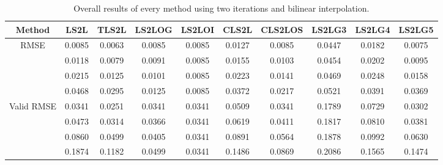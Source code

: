 \begin{table}[ht!]
\centering
\begin{tabular}{c|c|c|c|c|c|c|c|c|c}
Method & \scriptsize{LS2L} & \scriptsize{TLS2L} & \scriptsize{LS2LOG} & \scriptsize{LS2LOI} & \scriptsize{CLS2L} & \scriptsize{CLS2LOS} & \scriptsize{LS2LG3} & \scriptsize{LS2LG4} & \scriptsize{LS2LG5}\\ \hline 
\multirow{4}{*}{RMSE} & 0.0085 & 0.0063 & 0.0085 & 0.0085 & 0.0127 & 0.0085 & 0.0447 & 0.0182 & 0.0075 \\ 
 & 0.0118 & 0.0079 & 0.0091 & 0.0085 & 0.0155 & 0.0103 & 0.0454 & 0.0202 & 0.0095 \\ 
 & 0.0215 & 0.0125 & 0.0101 & 0.0085 & 0.0223 & 0.0141 & 0.0469 & 0.0248 & 0.0158 \\ 
 & 0.0468 & 0.0295 & 0.0125 & 0.0085 & 0.0372 & 0.0217 & 0.0521 & 0.0391 & 0.0369 \\ 
 \hline
\multirow{4}{*}{Valid RMSE} & 0.0341 & 0.0251 & 0.0341 & 0.0341 & 0.0509 & 0.0341 & 0.1789 & 0.0729 & 0.0302 \\ 
 & 0.0473 & 0.0314 & 0.0366 & 0.0341 & 0.0619 & 0.0411 & 0.1817 & 0.0810 & 0.0381 \\ 
 & 0.0860 & 0.0499 & 0.0405 & 0.0341 & 0.0891 & 0.0564 & 0.1878 & 0.0992 & 0.0630 \\ 
 & 0.1874 & 0.1182 & 0.0499 & 0.0341 & 0.1486 & 0.0869 & 0.2086 & 0.1565 & 0.1474 \\ 
 \hline 
\end{tabular}
\caption{Overall results of every method using two iterations and bilinear interpolation.}
\label{tab:2itL}
\end{table}


